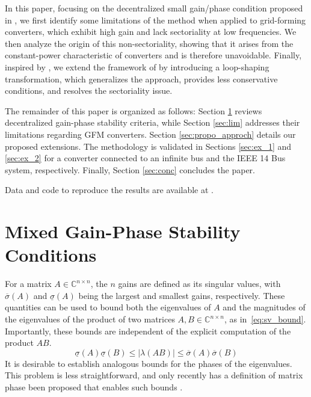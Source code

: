 In this paper, focusing on the decentralized small gain/phase condition proposed in \cite{huangGainPhaseDecentralized2024}, we first identify some limitations of the method when applied to grid-forming converters, which exhibit high gain and lack sectoriality at low frequencies. We then analyze the origin of this non-sectoriality, showing that it arises from the constant-power characteristic of converters and is therefore unavoidable. Finally, inspired by \cite{deyPassivityBasedDecentralizedCriteria2023}, we extend the framework of \cite{huangGainPhaseDecentralized2024} by introducing a loop-shaping transformation, which generalizes the approach, provides less conservative conditions, and resolves the sectoriality issue.

The remainder of this paper is organized as follows: Section \ref{sec:gain_phase_crit} reviews decentralized gain-phase stability criteria, while Section \ref{sec:lim} addresses their limitations regarding GFM converters. Section \ref{sec:propo_approch} details our proposed extensions. The methodology is validated in Sections \ref{sec:ex_1} and \ref{sec:ex_2} for a converter connected to an infinite bus and the IEEE 14 Bus system, respectively. Finally, Section \ref{sec:conc} concludes the paper.

Data and code to reproduce the results are available at \cite{RepoZenodo}.

\section{Mixed Gain-Phase Stability Conditions}
\label{sec:gain_phase_crit}

For a matrix $A\in \mathbb{C}^{n\times n}$, the $n$ gains are defined as its singular values, with $\overline{\sigma}(A)$ and $\underline{\sigma}(A)$ being the largest and smallest gains, respectively. These quantities can be used to bound both the eigenvalues of $A$ and the magnitudes of the eigenvalues of the product of two matrices $A,B\in\mathbb{C}^{n\times n}$, as in~\eqref{eq:sv_bound}. Importantly, these bounds are independent of the explicit computation of the product $AB$.
\begin{equation}
    \underline{\sigma}(A)\underline{\sigma}(B) \leq |\lambda(AB)| \leq \overline{\sigma}(A)\overline{\sigma}(B) 
    \label{eq:sv_bound}
\end{equation}
It is desirable to establish analogous bounds for the phases of the eigenvalues. This problem is less straightforward, and only recently has a definition of matrix phase been proposed that enables such bounds \cite{wangPhasesComplexMatrix2020, chenPhaseAnalysisIEEE}.


